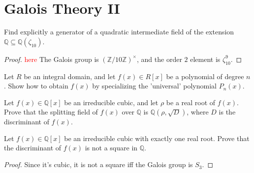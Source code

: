 \documentclass[openany]{book}
\newcommand{\Z}{\mathbb{Z}}
\begin{document}
\section{Galois Theory II}

\begin{prob}
    Find explicitly a generator of a quadratic intermediate field of the extension $\mathbb{Q} \subseteq \mathbb{Q}(\zeta_{10})$.
    \end{prob}
\begin{proof}
    \textcolor{red}{here}
    The Galois group is $(\Z/10\Z)^\times$, and the order $2$ element is $\zeta_{10}^9$.
\end{proof}

    
\begin{prob}
    Let $R$ be an integral domain, and let $f(x) \in R[x]$ be a polynomial of degree $n$. Show how to obtain $f(x)$ by specializing the 'universal' polynomial $P_n(x)$.
\end{prob}








\begin{prob}
Let \( f(x) \in \mathbb{Q}[x] \) be an irreducible cubic, and let \( \rho \) be a real root of \( f(x) \). Prove that the splitting field of \( f(x) \) over \( \mathbb{Q} \) is \( \mathbb{Q}(\rho, \sqrt{D}) \), where \( D \) is the discriminant of \( f(x) \).
\end{prob}

\begin{prob}
Let \( f(x) \in \mathbb{Q}[x] \) be an irreducible cubic with exactly one real root. Prove that the discriminant of \( f(x) \) is not a square in \( \mathbb{Q} \).
\end{prob}
\begin{proof}
    Since it's cubic, it is not a square iff the Galois group is $S_3$.
\end{proof}
\end{document}
